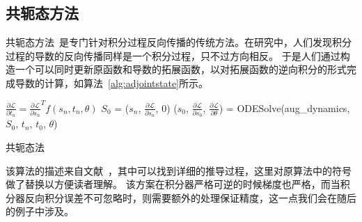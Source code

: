 \documentclass[A4,twoside,fontset=ubuntu,UTF8]{ctexart}
\begin{document}
\subsection{共轭态方法}
    共轭态方法~\cite{Plessix2006,Chen2018}是专门针对积分过程反向传播的传统方法。在研究中，人们发现积分过程的导数的反向传播同样是一个积分过程，只不过方向相反。
    于是人们通过构造一个可以同时更新原函数和导数的拓展函数，以对拓展函数的逆向积分的形式完成导数的计算，如算法~\ref{alg:adjointstate}所示。
\begin{algorithm}
    \SetAlgoLined
    \DontPrintSemicolon
        $\frac{\partial \mathcal{L}}{\partial t_n} = \frac{\partial \mathcal{L}}{\partial s_n}^Tf(s_n,t_n,\theta)$ 
        $S_0$ = ($s_n$, $\frac{\partial \mathcal{L}}{\partial s_n}$, $0$) 
        ($s_0$, $\frac{\partial \mathcal{L}}{\partial s_0}$, $\frac{\partial \mathcal{L}}{\partial \theta}$) = ODESolve(aug\_dynamics, $S_0$, $t_n$, $t_0$, $\theta$) 
    \caption{共轭态法}\label{alg:adjointstate}
\end{algorithm}

该算法的描述来自文献~\cite{Chen2018}，其中可以找到详细的推导过程，这里对原算法中的符号做了替换以方便读者理解。
该方案在积分器严格可逆的时候梯度也严格，而当积分器反向积分误差不可忽略时，则需要额外的处理保证精度，这一点我们会在随后的例子中涉及。
\end{document}
